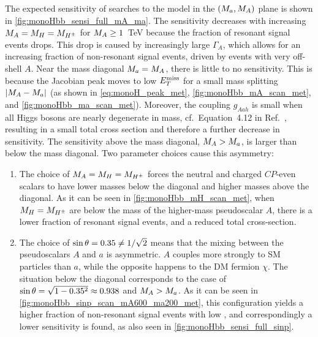 The expected sensitivity of \monohbb searches to the \hdma model in the $(M_{a},M_{A})$ plane is shown in \autoref{fig:monoHbb_sensi_full_mA_ma}.
The sensitivity decreases with increasing $M_{A} = M_{H} = M_{H^{\pm}}$ for $M_{A} \geq 1$~TeV because the fraction of resonant signal events drops. 
This drop is caused by increasingly large $\Gamma_A$, which allows for an increasing fraction of non-resonant signal events, driven by events with very off-shell $A$. 
Near the mass diagonal $M_{a} = M_{A}$, there is little to no sensitivity. 
This is because the Jacobian peak moves to low $E_T^\mathrm{miss}$ for a small mass splitting $|M_{A} - M_{a}|$  (as shown in \autoref{eq:monoH_peak_met}, \autoref{fig:monoHbb_mA_scan_met}, and \autoref{fig:monoHbb_ma_scan_met}). 
Moreover, the coupling $g_{Aah}$ is small when all Higgs bosons are nearly degenerate in mass, cf.~Equation~4.12 in Ref.~\cite{Bauer:2017ota}, %
resulting in a small total cross section and therefore a further decrease in sensitivity.
The sensitivity above the mass diagonal, $M_{A} > M_{a}$, is larger than below the mass diagonal.
Two parameter choices cause this asymmetry:
\begin{enumerate}
\item 
The choice of $M_{A} = M_{H} = M_{H^{\pm}}$ forces the neutral and charged $CP$-even scalars to have lower masses below the diagonal and higher masses above the diagonal. 
As it can be seen in \autoref{fig:monoHbb_mH_scan_met}, when $M_{H} = M_{H^{\pm}}$ are below the mass of the higher-mass pseudoscalar $A$, there is a lower fraction of resonant signal events, and a reduced total cross-section. 
\item 
The choice of $\sin\theta = 0.35 \neq 1/\sqrt{2}$ means that the mixing between the pseudoscalars $A$ and $a$ is asymmetric. 
$A$ couples more strongly to SM particles than $a$, while the opposite happens to the DM fermion $\chi$.
The situation below the diagonal corresponds to the case of $\sin\theta = \sqrt{1-0.35^2} \approx 0.938$ and $M_{A} > M_{a}$. 
As it can be seen in \autoref{fig:monoHbb_sinp_scan_mA600_ma200_met}, this \sinp configuration yields a higher fraction of non-resonant signal events with low \met, and correspondingly a lower sensitivity is found, as also seen in \autoref{fig:monoHbb_sensi_full_sinp}.
\end{enumerate}



